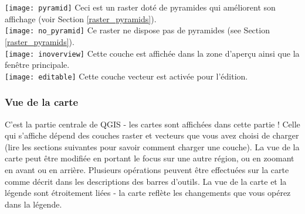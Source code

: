 \texttt{[image: pyramid]} Ceci est un raster dot\'e de pyramides qui am\'eliorent son affichage (voir
Section \ref{raster_pyramids}).\\
\texttt{[image: no\_pyramid]} Ce raster ne dispose pas de pyramides (see Section \ref{raster_pyramids}).\\
\texttt{[image: inoverview]} Cette couche est affich\'ee dans la zone d'aper\c{c}u ainsi que la fen\^etre principale.\\
\texttt{[image: editable]} Cette couche vecteur est activ\'ee pour l'\'edition.\\

\subsubsection{Vue de la carte}\label{label_mapview}


C'est la partie centrale de QGIS - les cartes sont affich\'ees dans cette partie ! Celle qui s'affiche d\'epend des couches raster et vecteurs que vous avez choisi de charger (lire les sections suivantes pour savoir comment charger une couche). La vue de la carte peut \^etre modifi\'ee en portant le focus sur une autre r\'egion, ou en zoomant en avant ou en arri\`ere. Plusieurs op\'erations peuvent \^etre effectu\'ees sur la carte comme d\'ecrit dans les descriptions des barres d'outils. La vue de la carte et la l\'egende sont \'etroitement li\'ees - la carte refl\`ete les changements que vous op\'erez dans la l\'egende.


